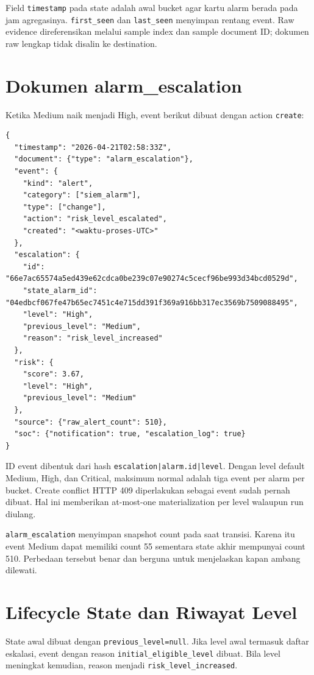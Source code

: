 \documentclass[11pt,a4paper,oneside]{report}
\DeclareRobustCommand{\code}[1]{\nolinkurl{#1}}
\begin{document}
Field \code{timestamp} pada state adalah awal bucket agar kartu alarm berada pada
jam agregasinya. \code{first\_seen} dan \code{last\_seen} menyimpan rentang event.
Raw evidence direferensikan melalui sample index dan sample document ID; dokumen
raw lengkap tidak disalin ke destination.

\chapter{Dokumen alarm\_escalation}

Ketika Medium naik menjadi High, event berikut dibuat dengan action \code{create}:

\begin{lstlisting}
{
  "timestamp": "2026-04-21T02:58:33Z",
  "document": {"type": "alarm_escalation"},
  "event": {
    "kind": "alert",
    "category": ["siem_alarm"],
    "type": ["change"],
    "action": "risk_level_escalated",
    "created": "<waktu-proses-UTC>"
  },
  "escalation": {
    "id": "66e7ac65574a5ed439e62cdca0be239c07e90274c5cecf96be993d34bcd0529d",
    "state_alarm_id": "04edbcf067fe47b65ec7451c4e715dd391f369a916bb317ec3569b7509088495",
    "level": "High",
    "previous_level": "Medium",
    "reason": "risk_level_increased"
  },
  "risk": {
    "score": 3.67,
    "level": "High",
    "previous_level": "Medium"
  },
  "source": {"raw_alert_count": 510},
  "soc": {"notification": true, "escalation_log": true}
}
\end{lstlisting}

ID event dibentuk dari hash \code{escalation|alarm.id|level}. Dengan level default
Medium, High, dan Critical, maksimum normal adalah tiga event per alarm per bucket.
Create conflict HTTP 409 diperlakukan sebagai event sudah pernah dibuat. Hal ini
memberikan at-most-one materialization per level walaupun run diulang.

\code{alarm\_escalation} menyimpan snapshot count pada saat transisi. Karena itu
event Medium dapat memiliki count 55 sementara state akhir mempunyai count 510.
Perbedaan tersebut benar dan berguna untuk menjelaskan kapan ambang dilewati.

\chapter{Lifecycle State dan Riwayat Level}

State awal dibuat dengan \code{previous\_level=null}. Jika level awal termasuk
daftar eskalasi, event dengan reason \code{initial\_eligible\_level} dibuat. Bila
level meningkat kemudian, reason menjadi \code{risk\_level\_increased}.
\end{document}
